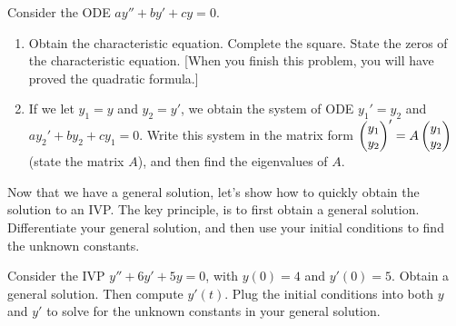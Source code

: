 \begin{problem*}
 Consider the ODE $ay''+by'+cy=0$. 
\begin{enumerate}
 \item Obtain the characteristic equation. Complete the square.  State the zeros of the characteristic equation. [When you finish this problem, you will have proved the quadratic formula.]
 \item If we let $y_1=y$ and $y_2=y'$, we obtain the system of ODE $y_1'=y_2$ and $ay_2'+by_2+cy_1=0$.  
 Write this system in the  matrix form $\begin{pmatrix} y_1\\y_2 \end{pmatrix}' = A \begin{pmatrix} y_1\\y_2 \end{pmatrix}$ (state the matrix $A$), and then find the eigenvalues of $A$.  
\end{enumerate}
\end{problem*}




Now that we have a general solution, let's show how to quickly obtain the solution to an IVP. The key principle, is to first obtain a general solution. Differentiate your general solution, and then use your initial conditions to find the unknown constants.

\begin{problem}
 Consider the IVP $y''+6y'+5y=0$, with $y(0)=4$ and $y'(0)=5$.  Obtain a general solution. Then compute $y'(t)$. Plug the initial conditions into both $y$ and $y'$ to solve for the unknown constants in your general solution. 
\end{problem}

